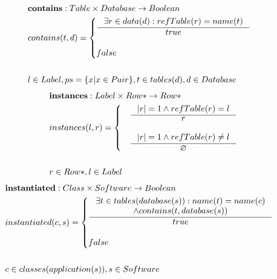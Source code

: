 \documentclass[11pt]{article}
\begin{document}
\begin{align*}
&	\mathbf{contains} : Table \times Database \rightarrow Boolean \\
&	contains(t, d) = \begin{cases}
			\inference{\exists r \in data(d) : refTable(r) = name(t) }{true} \\ \\
		 	false
 		\end{cases} \\ \\
& l \in Label, ps  = \{ x | x \in Pair\}, t \in tables(d), d \in Database
\end{align*}
\begin{align*}
&	\mathbf{instances} : Label \times Row* \rightarrow Row* \\
&	instances(l, r) = \begin{cases}
&		\inference{|r| = 1 \wedge refTable(r) = l}{r}\\\\
& 		\inference{|r| = 1 \wedge refTable(r) \neq l}{\varnothing}
 \end{cases} \\ \\
&	r \in Row*, l \in Label
\end{align*}
\begin{align*}
&	\mathbf{instantiated} : Class \times Software \rightarrow Boolean \\
&	instantiated(c, s) = \begin{cases} \inference{\exists t \in tables(database(s)) : name(t) = name(c) \\ \wedge contains(t, database(s))}{true} \\ \\
  false
 \end{cases} \\ \\
&	 c \in classes(application(s)), s \in Software 
\end{align*}
\end{document}
